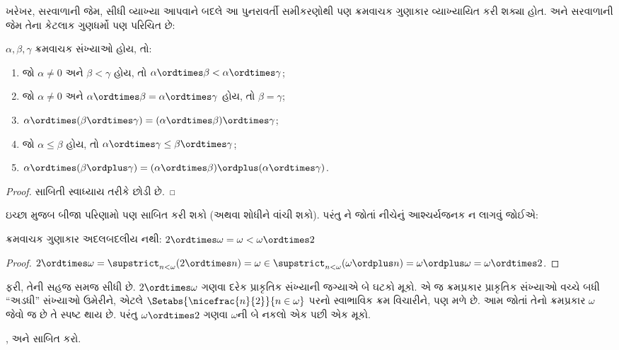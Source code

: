 \documentclass[../../../include/open-logic-section]{subfiles}
\begin{document}
ખરેખર, સરવાળાની જેમ, સીધી વ્યાખ્યા આપવાને બદલે
આ પુનરાવર્તી સમીકરણોથી પણ ક્રમવાચક ગુણાકાર
વ્યાખ્યાયિત કરી શક્યા હોત. અને સરવાળાની જેમ
તેના કેટલાક ગુણધર્મો પણ પરિચિત છે:

\begin{lem}
$\alpha, \beta, \gamma$ ક્રમવાચક સંખ્યાઓ હોય, તો:
\begin{enumerate}
	\item{} જો $\alpha \neq 0$ અને $\beta < \gamma$
	હોય, તો $\alpha \ordtimes \beta < \alpha \ordtimes \gamma$;
	\item{} જો $\alpha \neq 0$ અને $\alpha \ordtimes
	\beta = \alpha\ordtimes\gamma$ હોય, તો $\beta = \gamma$;
	\item{} $\alpha \ordtimes (\beta \ordtimes
	\gamma) = (\alpha \ordtimes \beta) \ordtimes \gamma$;
	\item{} જો $\alpha \leq \beta$ હોય, તો $\alpha
	\ordtimes \gamma \leq \beta \ordtimes \gamma$;
	\item{} $\alpha \ordtimes (\beta \ordplus
	\gamma) = (\alpha \ordtimes \beta )\ordplus (\alpha\ordtimes
	\gamma)$.
\end{enumerate}
\end{lem}

\begin{proof}
સાબિતી સ્વાધ્યાય તરીકે છોડી છે.
\end{proof}

ઇચ્છા મુજબ બીજા પરિણામો પણ સાબિત કરી શકો (અથવા
શોધીને વાંચી શકો). પરંતુ
ને
જોતાં નીચેનું આશ્ચર્યજનક ન લાગવું જોઈએ:

\begin{prop}
ક્રમવાચક ગુણાકાર અદલબદલીય નથી:
$2 \ordtimes \omega  =
\omega < \omega \ordtimes 2$
\end{prop}

\begin{proof}
$2 \ordtimes \omega = \supstrict_{n < \omega}(2\ordtimes  n) = \omega \in \supstrict_{n < \omega}(\omega \ordplus n) = \omega \ordplus \omega = \omega \ordtimes 2$.
\end{proof}
\noindent
ફરી, તેની સહજ સમજ સીધી છે. $2
\ordtimes \omega$ ગણવા દરેક પ્રાકૃતિક સંખ્યાની
જગ્યાએ બે ઘટકો મૂકો. એ જ ક્રમપ્રકાર પ્રાકૃતિક
સંખ્યાઓ વચ્ચે બધી ``અડધી'' સંખ્યાઓ ઉમેરીને,
એટલે $\Setabs{\nicefrac{n}{2}}{n \in \omega}$
પરનો સ્વાભાવિક ક્રમ વિચારીને, પણ મળે છે. આમ
જોતાં તેનો ક્રમપ્રકાર $\omega$ જેવો જ છે તે સ્પષ્ટ
થાય છે. પરંતુ $\omega \ordtimes 2$ ગણવા
$\omega$ની બે નકલો એક પછી એક મૂકો.

\begin{prob}
,
અને
સાબિત કરો.
\end{prob}
\end{document}
